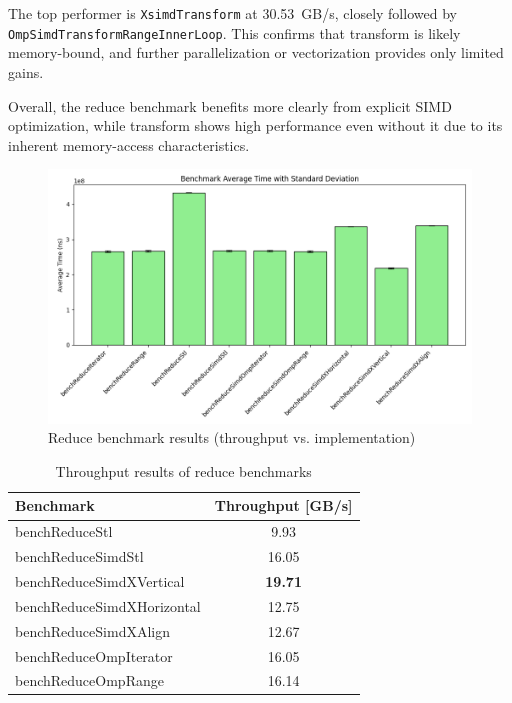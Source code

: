 The top performer is \texttt{XsimdTransform} at 30.53~GB/s, closely followed by \\
\texttt{OmpSimdTransformRangeInnerLoop}.
This confirms that transform is likely memory-bound, and further parallelization or vectorization provides only limited gains.

Overall, the reduce benchmark benefits more clearly from explicit SIMD optimization, while transform shows high performance even without it due to its inherent memory-access characteristics.

\pagebreak

\begin{figure}[h!]
    \centering
    \includegraphics[width=0.9\linewidth]{img/simd_reduce_output.txt_ex02.png}
    \caption{Reduce benchmark results (throughput vs. implementation)}
    \label{fig:simd_reduce_output}
\end{figure}

\begin{table}[h!]
    \centering
    \begin{tabular}{|l|c|}
        \hline
        \textbf{Benchmark}         & \textbf{Throughput [GB/s]} \\
        \hline
        benchReduceStl             & 9.93                       \\
        benchReduceSimdStl         & 16.05                      \\
        benchReduceSimdXVertical   & \textbf{19.71}             \\
        benchReduceSimdXHorizontal & 12.75                      \\
        benchReduceSimdXAlign      & 12.67                      \\
        benchReduceOmpIterator     & 16.05                      \\
        benchReduceOmpRange        & 16.14                      \\
        \hline
    \end{tabular}
    \caption{Throughput results of reduce benchmarks}
    \label{tab:simd_reduce_output}
\end{table}

